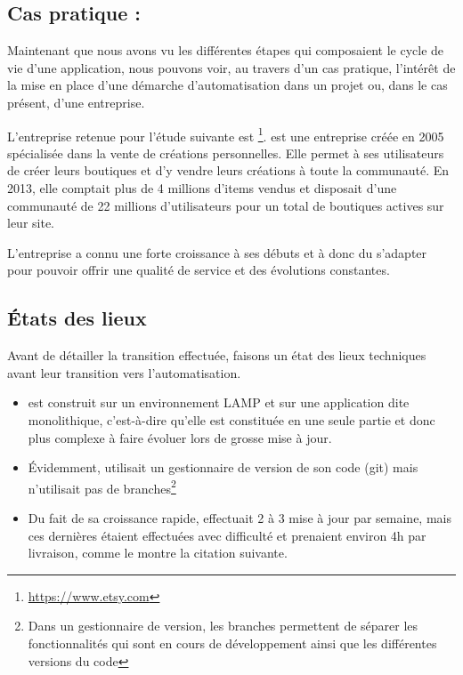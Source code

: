 \subsection{Cas pratique : \etsy}

Maintenant que nous avons vu les différentes étapes qui composaient le cycle de vie d'une application, nous pouvons voir, au travers d'un cas pratique, l'intérêt de la mise en place d'une démarche d'automatisation dans un projet ou, dans le cas présent, d'une entreprise.


L'entreprise retenue pour l'étude suivante est \etsy\footnote{\url{https://www.etsy.com}}. \etsy{} est une entreprise créée en 2005 spécialisée dans la vente de créations personnelles. Elle permet à ses utilisateurs de créer leurs boutiques et d'y vendre leurs créations à toute la communauté. En 2013, elle comptait plus de 4 millions d'items vendus et disposait d'une communauté de 22 millions d'utilisateurs pour un total de  boutiques actives sur leur site.

L'entreprise a connu une forte croissance à ses débuts et à donc du s'adapter pour pouvoir offrir une qualité de service et des évolutions constantes.

\subsection{États des lieux}

Avant de détailler la transition effectuée, faisons un état des lieux techniques avant leur transition vers l'automatisation.

\begin{itemize}
	\setlength\itemsep{0em}
	\item \etsy{} est construit sur un environnement \gls{LAMP} et sur une application dite monolithique, c'est-à-dire qu'elle est constituée en une seule partie et donc plus complexe à faire évoluer lors de grosse mise à jour.
	\item Évidemment, \etsy{} utilisait un gestionnaire de version de son code (\gls{git}) mais n'utilisait pas de branches\footnote{Dans un gestionnaire de version, les branches permettent de séparer les fonctionnalités qui sont en cours de développement ainsi que les différentes versions du code}
	\item Du fait de sa croissance rapide, \etsy{} effectuait 2 à 3 mise à jour par semaine, mais ces dernières étaient effectuées avec difficulté et prenaient environ 4h par livraison, comme le montre la citation suivante. 
\end{itemize}

